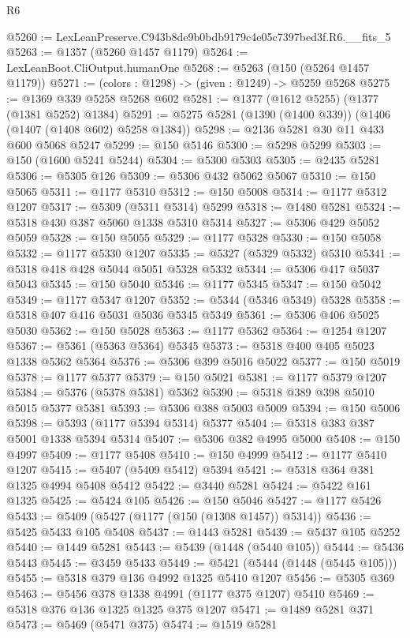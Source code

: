\begin{lexlean}{R6}
\begin{coremodule}
@5260 := LexLeanPreserve.C943b8de9b0bdb9179c4e05c7397bed3f.R6.__fits_5
@5263 := @1357 (@5260 @1457 @1179)
@5264 := LexLeanBoot.CliOutput.humanOne
@5268 := @5263 (@150 (@5264 @1457 @1179))
@5271 := (colors : @1298) -> (given : @1249) -> @5259 @5268
@5275 := @1369 @339 @5258 @5268 @602
@5281 := @1377 (@1612 @5255) (@1377 (@1381 @5252) @1384)
@5291 := @5275 @5281 (@1390 (@1400 @339)) (@1406 (@1407 (@1408 @602) @5258 @1384))
@5298 := @2136 @5281 @30 @11 @433 @600 @5068 @5247
@5299 := @150 @5146
@5300 := @5298 @5299
@5303 := @150 (@1600 @5241 @5244)
@5304 := @5300 @5303
@5305 := @2435 @5281
@5306 := @5305 @126
@5309 := @5306 @432 @5062 @5067
@5310 := @150 @5065
@5311 := @1177 @5310
@5312 := @150 @5008
@5314 := @1177 @5312 @1207
@5317 := @5309 (@5311 @5314) @5299
@5318 := @1480 @5281
@5324 := @5318 @430 @387 @5060 @1338 @5310 @5314
@5327 := @5306 @429 @5052 @5059
@5328 := @150 @5055
@5329 := @1177 @5328
@5330 := @150 @5058
@5332 := @1177 @5330 @1207
@5335 := @5327 (@5329 @5332) @5310
@5341 := @5318 @418 @428 @5044 @5051 @5328 @5332
@5344 := @5306 @417 @5037 @5043
@5345 := @150 @5040
@5346 := @1177 @5345
@5347 := @150 @5042
@5349 := @1177 @5347 @1207
@5352 := @5344 (@5346 @5349) @5328
@5358 := @5318 @407 @416 @5031 @5036 @5345 @5349
@5361 := @5306 @406 @5025 @5030
@5362 := @150 @5028
@5363 := @1177 @5362
@5364 := @1254 @1207
@5367 := @5361 (@5363 @5364) @5345
@5373 := @5318 @400 @405 @5023 @1338 @5362 @5364
@5376 := @5306 @399 @5016 @5022
@5377 := @150 @5019
@5378 := @1177 @5377
@5379 := @150 @5021
@5381 := @1177 @5379 @1207
@5384 := @5376 (@5378 @5381) @5362
@5390 := @5318 @389 @398 @5010 @5015 @5377 @5381
@5393 := @5306 @388 @5003 @5009
@5394 := @150 @5006
@5398 := @5393 (@1177 @5394 @5314) @5377
@5404 := @5318 @383 @387 @5001 @1338 @5394 @5314
@5407 := @5306 @382 @4995 @5000
@5408 := @150 @4997
@5409 := @1177 @5408
@5410 := @150 @4999
@5412 := @1177 @5410 @1207
@5415 := @5407 (@5409 @5412) @5394
@5421 := @5318 @364 @381 @1325 @4994 @5408 @5412
@5422 := @3440 @5281
@5424 := @5422 @161 @1325
@5425 := @5424 @105
@5426 := @150 @5046
@5427 := @1177 @5426
@5433 := @5409 (@5427 (@1177 (@150 (@1308 @1457)) @5314))
@5436 := @5425 @5433 @105 @5408
@5437 := @1443 @5281
@5439 := @5437 @105 @5252
@5440 := @1449 @5281
@5443 := @5439 (@1448 (@5440 @105))
@5444 := @5436 @5443
@5445 := @3459 @5433
@5449 := @5421 (@5444 (@1448 (@5445 @105)))
@5455 := @5318 @379 @136 @4992 @1325 @5410 @1207
@5456 := @5305 @369
@5463 := @5456 @378 @1338 @4991 (@1177 @375 @1207) @5410
@5469 := @5318 @376 @136 @1325 @1325 @375 @1207
@5471 := @1489 @5281 @371
@5473 := @5469 (@5471 @375)
@5474 := @1519 @5281

\end{coremodule}
\end{lexlean}
